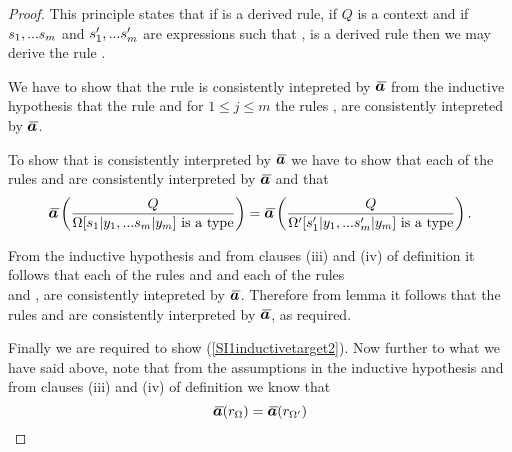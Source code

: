 \begin{proof}
This principle states that if  is a derived rule, if $Q$ is a context and if  $s_1,...s_{m}$ and $s'_1,...s'_{m}$ are expressions such that \foreachj,  is a derived rule then we may derive the rule \SIoneconclusion. 

We have to show that the rule \SIoneconclusion is consistently intepreted by $\Ibar$
from the inductive hypothesis  that the rule 
and for $1 \leq j \leq m$ the rules ,  are consistently intepreted by $\Ibar$.

To show that \SIoneconclusion is consistently interpreted by $\Ibar$
we have to show that each of the rules \SIoneconclusionlhs and \SIoneconclusionrhs
are consistently interpreted by $\Ibar$ and that
\begin{equation}
\label{SI1inductivetarget2}
\ibarmappedrule{Q}{\isT{\Omega[\SUBsFORy{m}]}} = \ibarmappedrule{Q}{\isT{\Omega'[\SUBspFORy{m}]}}.
\end{equation}

From the  inductive hypothesis  and from clauses (iii) and (iv) of definition  it follows that
each of the rules
\SIonesourcelhs
and
\SIonesourcerhs
and each of the rules
 \\
and
\wherej, are consistently intepreted by $\Ibar$. 
Therefore from lemma  it follows that
 the rules \SIoneconclusionlhs and \SIoneconclusionrhs
are consistently interpreted by $\Ibar$, as required.

Finally we are required to show  (\ref{SI1inductivetarget2}).
Now further to what we have said above, note that from the assumptions in the inductive hypothesis 
and from clauses (iii) and (iv) of definition  we know that
\begin{equation}
\label{SI1inductiveequation1}
\Ibar(r_\Omega)=\Ibar(r_{\Omega'})
\end{equation}


\end{proof}
